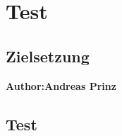 \chapter{Test}
\label{cha:Test}



\section{Zielsetzung}

\textbf{Author:Andreas Prinz} 

\section{Test}
